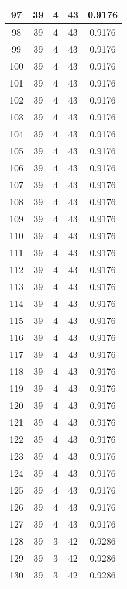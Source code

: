 \documentclass[letterpaper, 12pt]{article}
\begin{document}
\begin{longtable}{|c|c|c|c|c|}
\hline
97 & 39 & 4 & 43 & 0.9176 \\
\hline
98 & 39 & 4 & 43 & 0.9176 \\
\hline
99 & 39 & 4 & 43 & 0.9176 \\
\hline
100 & 39 & 4 & 43 & 0.9176 \\
\hline
101 & 39 & 4 & 43 & 0.9176 \\
\hline
102 & 39 & 4 & 43 & 0.9176 \\
\hline
103 & 39 & 4 & 43 & 0.9176 \\
\hline
104 & 39 & 4 & 43 & 0.9176 \\
\hline
105 & 39 & 4 & 43 & 0.9176 \\
\hline
106 & 39 & 4 & 43 & 0.9176 \\
\hline
107 & 39 & 4 & 43 & 0.9176 \\
\hline
108 & 39 & 4 & 43 & 0.9176 \\
\hline
109 & 39 & 4 & 43 & 0.9176 \\
\hline
110 & 39 & 4 & 43 & 0.9176 \\
\hline
111 & 39 & 4 & 43 & 0.9176 \\
\hline
112 & 39 & 4 & 43 & 0.9176 \\
\hline
113 & 39 & 4 & 43 & 0.9176 \\
\hline
114 & 39 & 4 & 43 & 0.9176 \\
\hline
115 & 39 & 4 & 43 & 0.9176 \\
\hline
116 & 39 & 4 & 43 & 0.9176 \\
\hline
117 & 39 & 4 & 43 & 0.9176 \\
\hline
118 & 39 & 4 & 43 & 0.9176 \\
\hline
119 & 39 & 4 & 43 & 0.9176 \\
\hline
120 & 39 & 4 & 43 & 0.9176 \\
\hline
121 & 39 & 4 & 43 & 0.9176 \\
\hline
122 & 39 & 4 & 43 & 0.9176 \\
\hline
123 & 39 & 4 & 43 & 0.9176 \\
\hline
124 & 39 & 4 & 43 & 0.9176 \\
\hline
125 & 39 & 4 & 43 & 0.9176 \\
\hline
126 & 39 & 4 & 43 & 0.9176 \\
\hline
127 & 39 & 4 & 43 & 0.9176 \\
\hline
128 & 39 & 3 & 42 & 0.9286 \\
\hline
129 & 39 & 3 & 42 & 0.9286 \\
\hline
130 & 39 & 3 & 42 & 0.9286 \\

\end{longtable}
\end{document}

